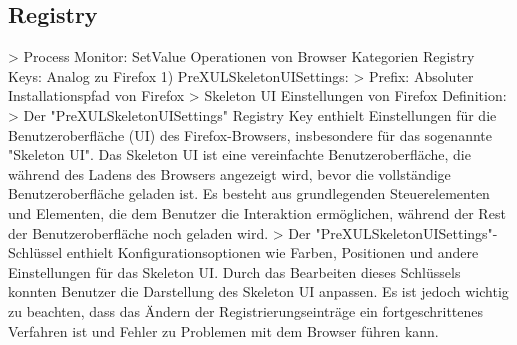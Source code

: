 \subsection*{Registry}
> Process Monitor: SetValue Operationen von Browser 
	Kategorien Registry Keys: Analog zu Firefox
	1) PreXULSkeletonUISettings:
		> Prefix: Absoluter Installationspfad von Firefox
		> Skeleton UI Einstellungen von Firefox %
			Definition:
				> Der "PreXULSkeletonUISettings" Registry Key enthielt Einstellungen für die Benutzeroberfläche (UI) des Firefox-Browsers, insbesondere für das sogenannte "Skeleton UI". Das Skeleton UI ist eine vereinfachte Benutzeroberfläche, die während des Ladens des Browsers angezeigt wird, bevor die vollständige Benutzeroberfläche geladen ist. Es besteht aus grundlegenden Steuerelementen und Elementen, die dem Benutzer die Interaktion ermöglichen, während der Rest der Benutzeroberfläche noch geladen wird.
				> Der "PreXULSkeletonUISettings"-Schlüssel enthielt Konfigurationsoptionen wie Farben, Positionen und andere Einstellungen für das Skeleton UI. Durch das Bearbeiten dieses Schlüssels konnten Benutzer die Darstellung des Skeleton UI anpassen. Es ist jedoch wichtig zu beachten, dass das Ändern der Registrierungseinträge ein fortgeschrittenes Verfahren ist und Fehler zu Problemen mit dem Browser führen kann.
			
